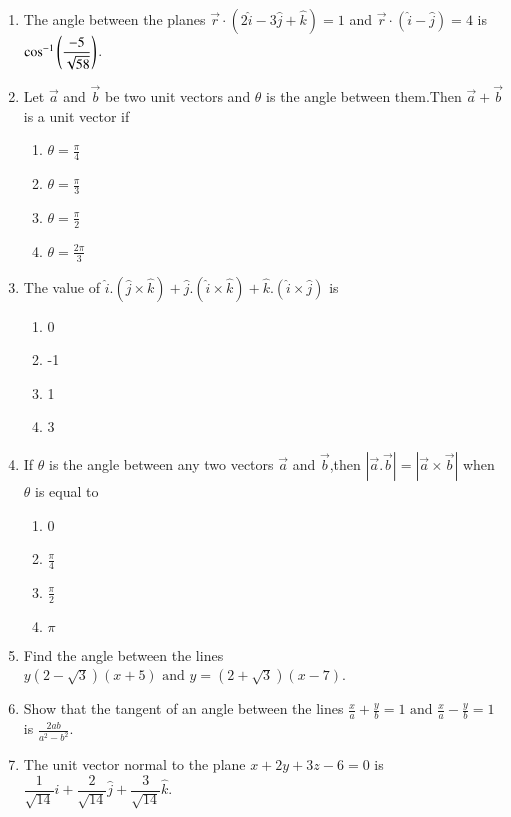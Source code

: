 \begin{enumerate}[label=\thesubsection.\arabic*,ref=\thesubsection.\theenumi]
\item The angle between the planes $\overrightarrow{r} \cdot (2\hat{i}-3\hat{j}+\hat{k})=1$ and $\overrightarrow{r} \cdot (\hat{i}-\hat{j})=4$ is $\cos^{-1} \left(\dfrac{-5}{\sqrt{58}}\right)$.
\item Let $\vec{a}$ and $\vec{b}$ be two unit vectors and $\theta$ is the angle between them.Then $\vec{a}+\vec{b}$ is a unit vector if
\begin{enumerate}
\item $\theta=\frac{\pi}{4}$
\item $\theta=\frac{\pi}{3}$
\item $\theta=\frac{\pi}{2}$
\item $\theta=\frac{2\pi}{3}$
\end{enumerate}
\item The value of $\hat{i}.(\hat{j}\times\hat{k})+\hat{j}.(\hat{i}\times\hat{k})+\hat{k}.(\hat{i}\times\hat{j})$ is
\begin{enumerate}
\item 0
\item -1
\item 1
\item 3
\end{enumerate}
\item If $\theta$ is the angle between any two vectors $\vec{a}$ and $\vec{b}$,then $|\vec{a}.\vec{b}|=|\vec{a}\times\vec{b}|$ when $\theta$ is equal to
\begin{enumerate}
\item 0
\item $\frac{\pi}{4}$
\item $\frac{\pi}{2}$
\item $\pi$
\end{enumerate}
\item Find the angle between the lines $y(2-\sqrt{3})(x+5)\text{ and }y=(2+\sqrt{3})(x-7)$.
\item Show that the tangent of an angle between the lines $\frac{x}{a}+\frac{y}{b}=1 \text{ and }\frac{x}{a}-\frac{y}{b}=1$ is $\frac{2ab}{a^2-b^2}$.
\item The unit vector normal to the plane $x+2y+3z-6=0$ is $\dfrac{1}{\sqrt{14}}\hat{i} + \dfrac{2}{\sqrt{14}}\hat{j} + \dfrac{3}{\sqrt{14}}\hat{k}$.
\end{enumerate}
